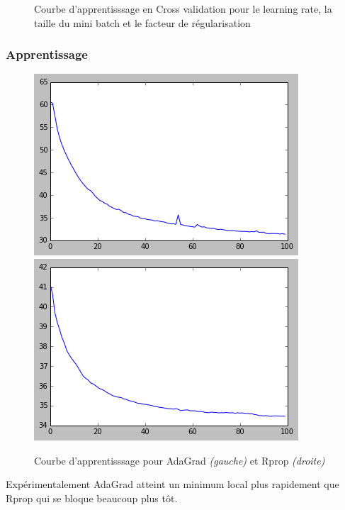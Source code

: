 \documentclass{beamer}
\begin{document}
\begin{frame}
\begin{figure}[htp]
\caption{Courbe d'apprentisssage en Cross validation pour le learning rate, la taille du mini batch et le facteur de régularisation}
\end{figure}

\end{frame}


\begin{frame}
\frametitle{Apprentissage}
\begin{figure}[htp]
\centering
\includegraphics[scale=0.4]{fig/CourbeValAdaGrad.png}
\includegraphics[scale=0.4]{fig/CourbeValRprop.png}
\caption{Courbe d'apprentisssage pour AdaGrad \emph{(gauche)} et Rprop \emph{(droite)}}
\end{figure}
Expérimentalement AdaGrad atteint un minimum local plus rapidement que Rprop qui se bloque beaucoup plus tôt.
\end{frame}

\end{document}
